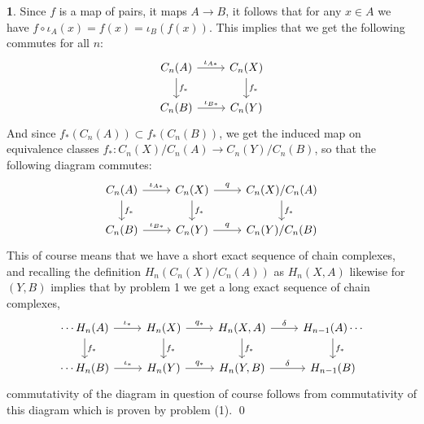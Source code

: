 \documentclass[10.5pt]{article}
\theoremstyle{definition}
\newtheorem{pb}{}
\begin{document}
    \begin{pb}
        Since \(f\) is a map of pairs, it maps \(A \to B\), it follows that for any \(x \in A\) we have \(f\circ \iota_A (x) = f(x) = \iota_B(f(x))\). This implies that we get the following commutes for all \(n\):
        \begin{equation*}
            \begin{tikzcd}
                C_n(A) \arrow[r,"\iota_{A*}"] \arrow[d,"f_*"] &C_n(X) \arrow[d,"f_*"] \\
                C_n(B) \arrow[r,"\iota_{B*}"] &C_n(Y)
            \end{tikzcd}
        \end{equation*}
        And since \(f_* (C_n(A)) \subset f_*(C_n(B))\), we get the induced map on equivalence classes \(f_*: C_n(X)/C_n(A) \to C_n(Y)/C_n(B)\), so that the following diagram commutes:
        \begin{equation*}
            \begin{tikzcd}
                C_n(A) \arrow[r,"\iota_{A*}"] \arrow[d,"f_*"] &C_n(X) \arrow[r,"q"] \arrow[d,"f_*"] &C_n(X)/C_n(A) \arrow[d,"f_*"] \\
                C_n(B) \arrow[r,"\iota_{B*}"] &C_n(Y) \arrow[r,"q"] &C_n(Y)/C_n(B)
            \end{tikzcd}
        \end{equation*}
        This of course means that we have a short exact sequence of chain complexes, and recalling the definition \(H_n(C_n(X)/C_n(A))\) as \(H_n(X,A)\) likewise for \((Y,B)\) implies that by problem 1 we get a long exact sequence of chain complexes,
        \begin{equation*}
            \begin{tikzcd}
            \cdots H_n(A) \arrow[d,"f_*"] \arrow[r, "\iota_*"] &H_n(X) \arrow[d,"f_*"] \arrow[r,"q_*"] &H_n(X,A) \arrow[d,"f_*"] \arrow[r,"\delta"] & H_{n-1}(A) \arrow[d,"f_*"] \cdots \\
            \cdots H_n(B) \arrow[r,"\iota_*"] &H_n(Y) \arrow[r,"q_*"] &H_n(Y,B) \arrow[r,"\delta"] &H_{n-1}(B)
            \end{tikzcd}
        \end{equation*}
        commutativity of the diagram in question of course follows from commutativity of this diagram which is proven by problem (1). \qed
    \end{pb}
\end{document}
